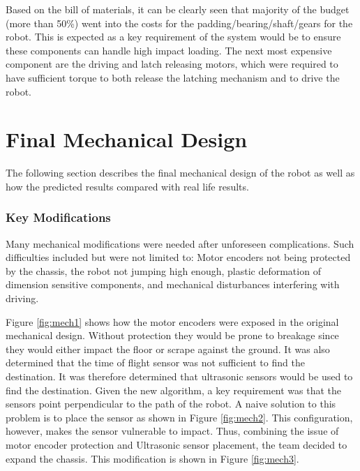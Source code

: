 \documentclass[ece]{uw-wkrpt}
\let\oldsection\section
\renewcommand\section{\clearpage\oldsection}
\begin{document}
Based on the bill of materials, it can be clearly seen that majority of the budget (more than 50\%) went into the costs for the padding/bearing/shaft/gears for the robot. This is expected as a key requirement of the system would be to ensure these components can handle high impact loading. The next most expensive component are the driving and latch releasing motors, which were required to have sufficient torque to both release the latching mechanism and to drive the robot. 

\section{Final Mechanical Design} \label{mech}

The following section describes the final mechanical design of the robot as well as how the predicted results compared with real life results.

\subsubsection{Key Modifications}

Many mechanical modifications were needed after unforeseen complications. Such difficulties included but were not limited to: Motor encoders not being protected by the chassis, the robot not jumping high enough, plastic deformation of dimension sensitive components, and mechanical disturbances interfering with driving.  

Figure \ref{fig:mech1} shows how the motor encoders were exposed in the original mechanical design. Without protection they would be prone to breakage since they would either impact the floor or scrape against the ground. It was also determined that the time of flight sensor was not sufficient to find the destination. It was therefore determined that ultrasonic sensors would be used to find the destination. Given the new algorithm, a key requirement was that the sensors point perpendicular to the path of the robot. A naive solution to this problem is to place the sensor as shown in Figure \ref{fig:mech2}. This configuration, however, makes the sensor vulnerable to impact. Thus, combining the issue of motor encoder protection and Ultrasonic sensor placement, the team decided to expand the chassis. This modification is shown in Figure \ref{fig:mech3}. 
\end{document}
